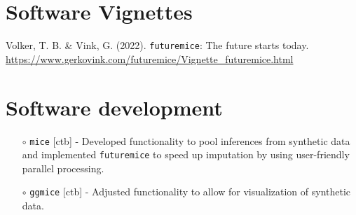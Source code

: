 \documentclass[11pt,a4paper,roman,colorlinks,linkcolor = blue]{moderncv}        %
\begin{document}

\section{Software Vignettes}

Volker, T. B. \& Vink, G. (2022). \texttt{futuremice}: The future starts today. \url{https://www.gerkovink.com/futuremice/Vignette_futuremice.html}

\section{Software development}

{\begin{minipage}{\maincolumnwidth}%
	\small{
  \begin{itemize}
    \item[$\circ$] \texttt{mice} [ctb] - Developed functionality to pool inferences from synthetic data and implemented \texttt{futuremice} to speed up imputation by using user-friendly parallel processing.
    \item[$\circ$] \texttt{ggmice} [ctb] - Adjusted functionality to allow for visualization of synthetic data.
  \end{itemize}}
\end{minipage}}


\end{document}
